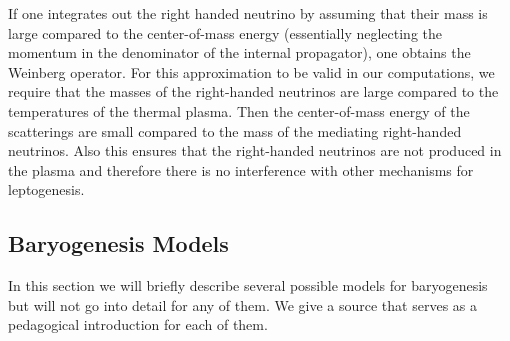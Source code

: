 \documentclass[13pt,a4paper,titlepage]{article}
\begin{document}
If one integrates out the right handed neutrino by assuming that their mass is
large compared to the center-of-mass energy (essentially neglecting the momentum in the denominator of the internal propagator), one obtains the Weinberg operator.
For this approximation to be valid in our computations, we require that
the masses of the right-handed neutrinos are large compared to the temperatures
of the thermal plasma. Then the center-of-mass energy of the scatterings are
small compared to the mass of the mediating right-handed neutrinos.
Also this ensures that the right-handed neutrinos are not produced in the plasma and therefore there is no interference with other mechanisms for leptogenesis.

\subsection{Baryogenesis Models}
\label{sec:baryogenesis_models}
In this section we will briefly describe several possible models for baryogenesis but will not go into detail for any of them.
We give a source that serves as a pedagogical introduction for each of them.
\end{document}
